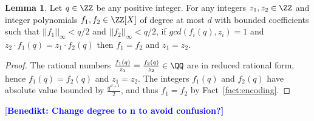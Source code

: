 \documentclass{article}
\theoremstyle{definition}
\newtheorem{lemma}{Lemma}
\newtheorem{fact}{Fact}
\newcommand{\benedikt}[1]{{\textcolor{blue}{[\bf Benedikt: #1]}}}
\begin{document}
\begin{lemma}
\label{lem:encoding}
Let $q \in \Z$ be any positive integer. For any integers $z_1, z_2 \in \ZZ$ and integer polynomials $f_1, f_2 \in \ZZ[X]$ of degree at most $d$ with bounded coefficients such that $||f_1||_\infty < q/2$ and $||f_2||_\infty < q/2$, if $gcd(f_i(q), z_i) = 1$ and $z_2 \cdot f_1(q) = z_1 \cdot f_2(q)$ then 
$f_1 = f_2$ and $z_1 = z_2$. 
\end{lemma}
\begin{proof}
The rational numbers $\frac{f_1(q)}{z_1} = \frac{f_2(q)}{z_2} \in \QQ$ are in reduced rational form, hence $f_1(q) = f_2(q)$ and $z_1 = z_2$. The integers $f_1(q)$ and $f_2(q)$ have absolute value bounded by $\frac{q^{d+1}}{2}$, and thus $f_1 = f_2$ by Fact~\ref{fact:encoding}.
\end{proof}

\benedikt{Change degree to n to avoid confusion?}



	
		
\end{document}
